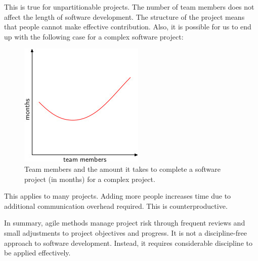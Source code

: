 \documentclass[a4paper, openany]{memoir}
\begin{document}
\noindent This is true for unpartitionable projects. The number of team members does not affect the length of software development. The structure of the project means that people cannot make effective contribution. Also, it is possible for us to end up with the following case for a complex software project:
\begin{figure}[H]
    \centering
    \includegraphics{src/2.6 Complex.png}
    \caption{Team members and the amount it takes to complete a software project (in months) for a complex project.}
\end{figure}
\noindent This applies to many projects. Adding more people increases time due to additional communication overhead required. This is counterproductive.

In summary, agile methods manage project risk through frequent reviews and small adjustments to project objectives and progress. It is not a discipline-free approach to software development. Instead, it requires considerable discipline to be applied effectively.
\end{document}
